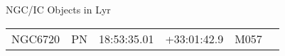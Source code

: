 \begin{block}{NGC/IC Objects in Lyr}
  \centering
  \begin{tabularx}{\textwidth}{llrrll} 
    NGC6720 & PN & 18:53:35.01 & +33:01:42.9  & M057 \\ 
  \end{tabularx}
\end{block}